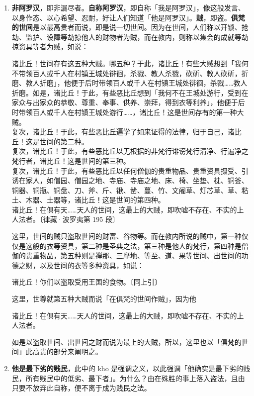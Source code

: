 \begin{enumerate}\item \textbf{非阿罗汉}，即非漏尽者。\textbf{自称阿罗汉}，即自称「我是阿罗汉」，像这般发言、以身作态、以心希望、忍耐，好让人们知道「他是阿罗汉」。\textbf{贼}，即盗。\textbf{俱梵的世间}是以最高贵者而说，即是说一切世间。因为在世间，人们称以开锁、抢劫、监护、设障等劫掠他人的财物者为贼，而在教内，则称以集会的成就等劫掠资具等者为贼，如说：\begin{quoting}诸比丘！世间存有这五种大贼。哪五种？于此，诸比丘！有些大贼想到「我何不带领百人或千人在村镇王城处徘徊，杀戮、教人杀戮，砍斫、教人砍斫，折磨、教人折磨」，他便于后时带领百人或千人在村镇王城处徘徊，杀戮……教人折磨。如是，诸比丘！于此，有些恶比丘想到「我何不在王城处游行，受到在家众与出家众的恭敬、尊重、奉事、供养、崇拜，得到衣等利养」，他便于后时带领百人或千人在村镇王城处游行……，诸比丘！这是世间存有的第一种大贼。\\复次，诸比丘！于此，有些恶比丘遍学了如来证得的法律，归于自己，诸比丘！这是世间的第二种。\\复次，诸比丘！于此，有些恶比丘以无根据的非梵行诽谤梵行清净、行遍净之梵行者，诸比丘！这是世间的第三种。\\复次，诸比丘！于此，有些恶比丘以任何僧伽的贵重物品、贵重资具摄受、引诱在家人，如僧园、僧园之地、寺庙、寺庙之地、床、椅、坐垫、枕、铜釜、铜器、铜瓶、铜盘、刀、斧、斤、锹、凿、蔓、竹、文阇草、灯芯草、草、粘土、木器、土器等，诸比丘！这是世间的第四种。\\诸比丘！在俱有天……天人的世间，这最上的大贼，即吹嘘不存在、不实的上人法者。{\bluefootnotesize 〔律藏·波罗夷第 195 段〕}\end{quoting}这里，世间的贼只盗取世间的财富、谷物等。而在教内所说的贼中，第一种仅仅是这般的衣等资具，第二种是圣典之法，第三种是他人的梵行，第四种是僧伽的贵重物品，第五种则是禅那、三摩地、等至、道、果等世间、出世间的功德之财，以及世间的衣等多种资具，如说：\begin{quoting}诸比丘！你们以盗取受用王国的食物。{\bluefootnotesize 〔同上引〕}\end{quoting}这里，世尊就第五种大贼而说「在俱梵的世间作贼」，因为他\begin{quoting}诸比丘！在俱有天……天人的世间，这最上的大贼，即吹嘘不存在、不实的上人法者。\end{quoting}如是以盗取世间、出世间之财而说为最上的大贼，所以，这里也以「俱梵的世间」此高贵的部分来阐明之。
\item \textbf{他是最下劣的贱民}，此中的 kho 是强调之义，以此强调「他确实是最下劣的贱民，所有贱民中的低劣、最下者」。为什么？由在殊胜的事上落入盗法，且由只要不放弃此自称，便不离于成为贱民之法。

\end{enumerate}
